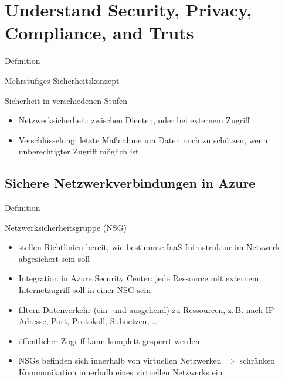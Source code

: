\documentclass{scrartcl}
\newenvironment{flashcard}[2][]{%
    #1
    \vfill
    \centerline{\Large{#2}}
    \vfill
\newpage
}
{\newpage}
\newcommand{\sectioncard}[1]{
    \vspace*{\stretch{1}}
    \section{#1}
    \vspace*{\stretch{1}}
    \pagebreak
}
\newcommand{\subsectioncard}[1]{
    \vspace*{\stretch{1}}
    \subsection{#1}
    \vspace*{\stretch{1}}
    \pagebreak
}
\begin{document}
    \sectioncard{Understand Security, Privacy, Compliance, and Truts}

    \begin{flashcard}[Definition]{Mehrstufiges Sicherheitskonzept}
        Sicherheit in verschiedenen Stufen
        \begin{itemize}
            \item Netzwerksicherheit: zwischen Dienten, oder bei externem Zugriff
            \item Verschlüsselung: letzte Maßnahme um Daten noch zu schützen, wenn unberechtigter Zugriff möglich ist
        \end{itemize}
    \end{flashcard}

    \subsectioncard{Sichere Netzwerkverbindungen in Azure}

    \begin{flashcard}[Definition]{Netzwerksicherheitsgruppe (NSG)}
        \begin{itemize}
            \item stellen Richtlinien bereit, wie bestimmte IaaS-Infrastruktur im Netzwerk abgesichert sein soll
            \item Integration in Azure Security Center: jede Ressource mit externem Internetzugriff soll in einer NSG sein
            \item filtern Datenverkehr (ein- und ausgehend) zu Ressourcen, z.\,B. nach IP-Adresse, Port, Protokoll, Subnetzen, \ldots
            \item öffentlicher Zugriff kann komplett gesperrt werden
            \item NSGs befinden sich innerhalb von virtuellen Netzwerken\newline
            $\Rightarrow$ schränken Kommunikation innerhalb eines virtuellen Netzwerks ein
        \end{itemize}

    \end{flashcard}
\end{document}
